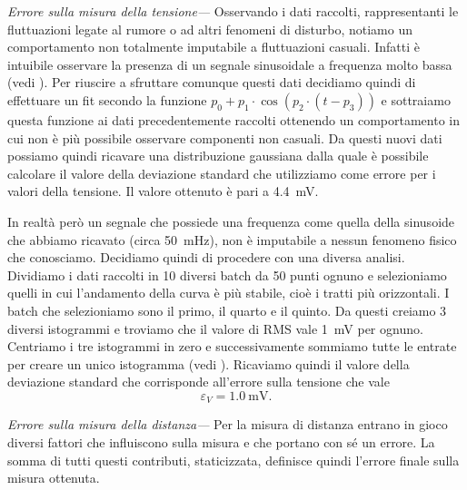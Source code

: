 \documentclass[
    rmp,
    reprint, 
    superscriptaddress, 
    altaffilletter, 
    amsmath, 
    amssymb,
    a4paper]{revtex4-2}
\begin{document}
\noindent\textit{Errore sulla misura della tensione---}
Osservando i dati raccolti, rappresentanti le fluttuazioni legate al rumore o ad altri fenomeni di disturbo, notiamo un comportamento non totalmente imputabile a fluttuazioni casuali. Infatti è intuibile osservare la presenza di un segnale sinusoidale a frequenza molto bassa (vedi ). Per riuscire a sfruttare comunque questi dati decidiamo quindi di effettuare un fit secondo la funzione $p_0+p_1\cdot \cos(p_2\cdot (t-p_3))$ e sottraiamo questa funzione ai dati precedentemente raccolti ottenendo un comportamento in cui non è più possibile osservare componenti non casuali. Da questi nuovi dati possiamo quindi ricavare una distribuzione gaussiana dalla quale è possibile calcolare il valore della deviazione standard che utilizziamo come errore per i valori della tensione. Il valore ottenuto è pari a \SI{4.4}{\milli\volt}.

In realtà però un segnale che possiede una frequenza come quella della sinusoide che abbiamo ricavato (circa \SI{50}{\milli\hertz}), non è imputabile a nessun fenomeno fisico che conosciamo. Decidiamo quindi di procedere con una diversa analisi. Dividiamo i dati raccolti in 10 diversi batch da 50 punti ognuno e selezioniamo quelli in cui l'andamento della curva è più stabile, cioè i tratti più orizzontali. I batch che selezioniamo sono il primo, il quarto e il quinto. Da questi creiamo 3 diversi istogrammi e troviamo che il valore di RMS vale \SI{1}{\milli\volt} per ognuno. Centriamo i tre istogrammi in zero e successivamente sommiamo tutte le entrate per creare un unico istogramma (vedi ). Ricaviamo quindi il valore della deviazione standard che corrisponde all'errore sulla tensione che vale \[\varepsilon_{V} = \SI{1.0}{\milli\volt}.\]


\noindent\textit{Errore sulla misura della distanza---}
Per la misura di distanza entrano in gioco diversi fattori che influiscono sulla misura e che portano con sé un errore. La somma di tutti questi contributi, staticizzata, definisce quindi l'errore finale sulla misura ottenuta. 
\end{document}
